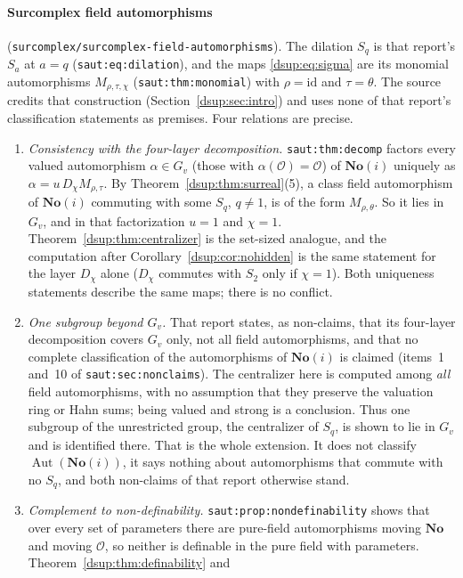 \documentclass[11pt,oneside]{article}
\numberwithin{equation}{section}
\theoremstyle{definition}
\theoremstyle{remark}
\newcommand{\No}{\mathbf{No}}
\newcommand{\OO}{\mathcal O}
\newcommand{\id}{\mathrm{id}}
\newcommand{\Aut}{\operatorname{Aut}}
\newcommand{\repo}[1]{\nolinkurl{#1}}%
\newcommand{\lbl}[1]{\nolinkurl{#1}}%
\begin{document}
\paragraph{Surcomplex field automorphisms}
(\repo{surcomplex/surcomplex-field-automorphisms}). The dilation $S_q$ is
that report's $S_a$ at $a=q$ (\lbl{saut:eq:dilation}), and the maps
\eqref{dsup:eq:sigma} are its monomial automorphisms $M_{\rho,\tau,\chi}$
(\lbl{saut:thm:monomial}) with $\rho=\id$ and $\tau=\theta$. The source
credits that construction (Section~\ref{dsup:sec:intro}) and uses none of
that report's classification statements as premises. Four relations are
precise.
\begin{enumerate}[leftmargin=*,itemsep=3pt]
\item \emph{Consistency with the four-layer decomposition.}
\lbl{saut:thm:decomp} factors every valued automorphism $\alpha\in G_v$
(those with $\alpha(\OO)=\OO$) of $\No(i)$ uniquely as
$\alpha=u\,D_\chi M_{\rho,\tau}$. By Theorem~\ref{dsup:thm:surreal}(5), a
class field automorphism of $\No(i)$ commuting with some $S_q$, $q\ne1$, is
of the form $M_{\rho,\theta}$. So it lies in $G_v$, and in that
factorization $u=1$ and $\chi=1$. Theorem~\ref{dsup:thm:centralizer} is the
set-sized analogue, and the computation after
Corollary~\ref{dsup:cor:nohidden} is the same statement for the layer
$D_\chi$ alone ($D_\chi$ commutes with $S_2$ only if $\chi=1$). Both
uniqueness statements describe the same maps; there is no conflict.
\item \emph{One subgroup beyond $G_v$.} That report states, as non-claims,
that its four-layer decomposition covers $G_v$ only, not all field
automorphisms, and that no complete classification of the automorphisms of
$\No(i)$ is claimed (items~1 and~10 of \lbl{saut:sec:nonclaims}). The
centralizer here is computed among \emph{all} field automorphisms, with no
assumption that they preserve the valuation ring or Hahn sums; being valued
and strong is a conclusion. Thus one subgroup of the unrestricted group,
the centralizer of $S_q$, is shown to lie in $G_v$ and is identified there.
That is the whole extension. It does not classify $\Aut(\No(i))$, it says
nothing about automorphisms that commute with no $S_q$, and both non-claims
of that report otherwise stand.
\item \emph{Complement to non-definability.}
\lbl{saut:prop:nondefinability} shows that over every set of parameters
there are pure-field automorphisms moving $\No$ and moving $\OO$, so neither
is definable in the pure field with parameters.
Theorem~\ref{dsup:thm:definability} and

\end{enumerate}
\end{document}

